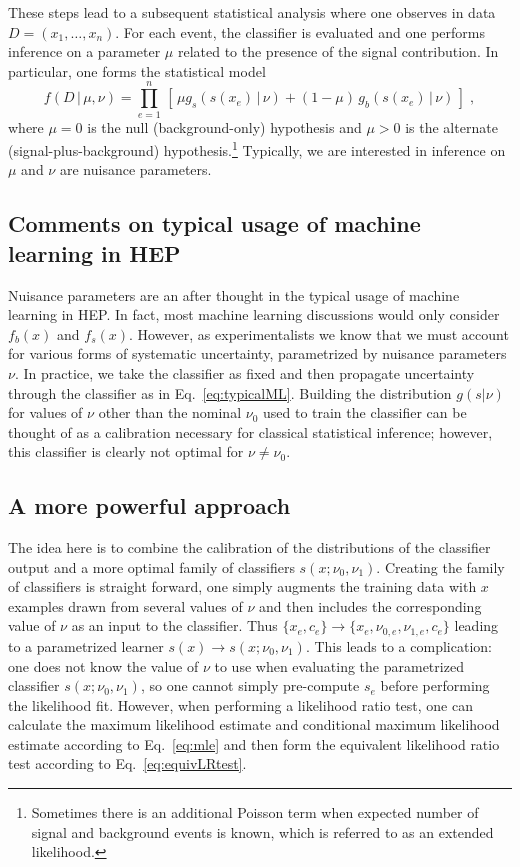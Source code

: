 \documentclass[11pt, oneside]{article}   	%
\begin{document}
These steps lead to a subsequent statistical analysis where one observes in data $D=(x_1, \dots, x_n)$. For each event, the classifier is evaluated and one performs inference on a parameter $\mu$ related to the presence of the signal contribution. In particular, one forms the statistical model
\begin{equation}\label{eq:typicalML}
f( D \,|\, \mu, \nu) = \prod_{e=1}^n \, \left[\, \mu g_s( s(x_e) \, |\,  \nu)  + (1-\mu)\, g_b( s(x_e) \,|\, \nu) \,\right] \; ,
\end{equation}
where $\mu=0$ is the null (background-only) hypothesis and $\mu>0$ is the alternate (signal-plus-background) hypothesis.\footnote{Sometimes there is an additional Poisson term when expected number of signal and background events is known, which is referred to as an extended likelihood.} Typically, we are interested in inference on $\mu$ and $\nu$ are nuisance parameters.

\subsection{Comments on typical usage of machine learning in HEP}

Nuisance parameters are an after thought in the typical usage of machine learning in HEP. In fact, most machine learning discussions would only consider $f_b(x)$ and $f_s(x)$. However, as experimentalists we know that we must account for various forms of systematic uncertainty, parametrized by nuisance parameters $\nu$. In practice, we take the classifier as fixed and then propagate uncertainty through the classifier as in Eq.~\ref{eq:typicalML}. Building the distribution $g(s|\nu)$ for values of $\nu$ other than the nominal $\nu_0$ used to train the classifier can be thought of as a calibration necessary for classical statistical inference; however, this classifier is clearly not optimal for $\nu \ne \nu_0$.

\subsection{A more powerful  approach}

The idea here is to combine the calibration of the distributions of the classifier output and a more optimal family of classifiers $s(x; \nu_0, \nu_1)$. Creating the family of classifiers is straight forward, one simply augments the training data with $x$ examples drawn from several values of $\nu$ and then includes the corresponding value of $\nu$ as an input to the classifier. Thus $\{x_e,c_e\} \to \{x_e,\nu_{0,e},\nu_{1,e}, c_e\}$ leading to a parametrized learner $s(x)\to s(x;\nu_0, \nu_1)$. This leads to a complication: one does not know the value of $\nu$ to use when evaluating the parametrized classifier $s(x;\nu_0, \nu_1)$, so one cannot simply pre-compute $s_e$ before performing the likelihood fit.  However, when performing a likelihood ratio test, one can calculate the maximum likelihood estimate and conditional maximum likelihood estimate according to Eq.~\ref{eq:mle} and then form the equivalent likelihood ratio test according to Eq.~\ref{eq:equivLRtest}. 
\end{document}

